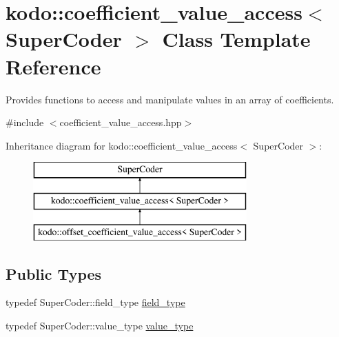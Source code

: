 \hypertarget{classkodo_1_1coefficient__value__access}{\section{kodo\-:\-:coefficient\-\_\-value\-\_\-access$<$ Super\-Coder $>$ Class Template Reference}
\label{classkodo_1_1coefficient__value__access}
}


Provides functions to access and manipulate values in an array of coefficients.  




{\ttfamily \#include $<$coefficient\-\_\-value\-\_\-access.\-hpp$>$}

Inheritance diagram for kodo\-:\-:coefficient\-\_\-value\-\_\-access$<$ Super\-Coder $>$\-:\begin{figure}[H]
\begin{center}
\leavevmode
\includegraphics[height=3.000000cm]{classkodo_1_1coefficient__value__access}
\end{center}
\end{figure}
\subsection*{Public Types}
\begin{DoxyCompactItemize}
\item 
typedef Super\-Coder\-::field\-\_\-type \hyperlink{classkodo_1_1coefficient__value__access_adc855376cdaecd12e14da4257bee281a}{field\-\_\-type}
\begin{DoxyCompactList}\small\item\em \end{DoxyCompactList}\item 
typedef Super\-Coder\-::value\-\_\-type \hyperlink{classkodo_1_1coefficient__value__access_a629750d630f4188d48eb49f76cf750f1}{value\-\_\-type}
\begin{DoxyCompactList}\small\item\em \end{DoxyCompactList}\end{DoxyCompactItemize}
